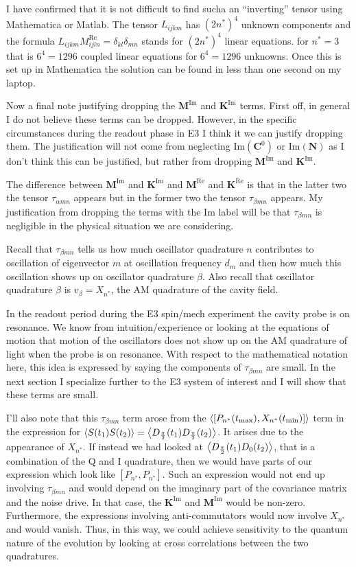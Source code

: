 \documentclass[12pt]{article}
\newcommand{\bv}[1]{\boldsymbol{#1}}
\begin{document}
I have confirmed that it is not difficult to find sucha an ``inverting'' tensor using Mathematica or Matlab. The tensor $L_{ijkm}$ has $(2n^*)^4$ unknown components and the formula $L_{ijkm}M^{\text{Re}}_{ijln} = \delta_{kl}\delta_{mn}$ stands for $(2n^*)^4$ linear equations. for $n^* = 3$ that is $6^4 = 1296$ coupled linear equations for $6^4 = 1296$ unknowns. Once this is set up in Mathematica the solution can be found in less than one second on my laptop.

Now a final note justifying dropping the $\bv{M}^{\text{Im}}$ and $\bv{K}^{\text{Im}}$ terms. First off, in general I do not believe these terms can be dropped. However, in the specific circumstances during the readout phase in E3 I think it we can justify dropping them. The justification will not come from neglecting $\text{Im}(\bv{C}^0)$ or $\text{Im}(\bv{N})$ as I don't think this can be justified, but rather from dropping $\bv{M}^{\text{Im}}$ and $\bv{K}^{\text{Im}}$.

The difference between $\bv{M}^{\text{Im}}$ and $\bv{K}^{\text{Im}}$ and $\bv{M}^{\text{Re}}$ and $\bv{K}^{\text{Re}}$ is that in the latter two the tensor $\tau_{\alpha mn}$ appears but in the former two the tensor $\tau_{\beta mn}$ appears. My justification from dropping the terms with the Im label will be that $\tau_{\beta mn}$ is negligible in the physical situation we are considering.

Recall that $\tau_{\beta mn}$ tells us how much oscillator quadrature $n$ contributes to oscillation of eigenvector $m$ at oscillation frequency $d_m$ and then how much this oscillation shows up on oscillator quadrature $\beta$. Also recall that oscillator quadrature $\beta$ is $v_{\beta} = X_{n^*}$, the AM quadrature of the cavity field. 

In the readout period during the E3 spin/mech experiment the cavity probe is on resonance. We know from intuition/experience or looking at the equations of motion that motion of the oscillators does not show up on the AM quadrature of light when the probe is on resonance. With respect to the mathematical notation here, this idea is expressed by saying the components of $\tau_{\beta mn}$ are small. In the next section I specialize further to the E3 system of interest and I will show that these terms are small.

I'll also note that this $\tau_{\beta mn}$ term arose from the $\Braket{[P_{n^*}(t_{\text{max}}),X_{n^*}(t_{\text{min}})]}$ term in the expression for $\Braket{S(t_1)S(t_2)} = \Braket{D_{\frac{\pi}{2}}(t_1)D_{\frac{\pi}{2}}(t_2)}$. It arises due to the appearance of $X_{n^*}$. If instead we had looked at $\Braket{D_{\frac{\pi}{2}}(t_1)D_0(t_2)}$, that is a combination of the Q and I quadrature, then we would have parts of our expression which look like $[P_{n^*},P_{n^*}]$. Such an expression would not end up involving $\tau_{\beta mn}$ and would depend on the imaginary part of the covariance matrix and the noise drive. In that case, the $\bv{K}^{\text{Im}}$ and $\bv{M}^{\text{Im}}$ would be non-zero. Furthermore, the expressions involving anti-commutators would now involve $X_{n^*}$ and would vanish. Thus, in this way, we could achieve sensitivity to the quantum nature of the evolution by looking at cross correlations between the two quadratures.
\end{document}
